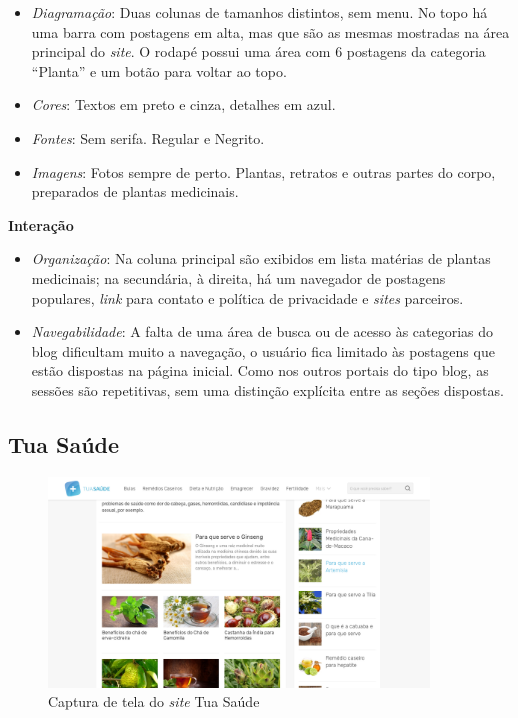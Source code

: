 \begin{itemize}
\item
  \emph{Diagramação}: Duas colunas de tamanhos distintos, sem menu. No topo há uma barra com postagens em alta, mas que são as mesmas mostradas na área principal do \emph{site}. O rodapé possui uma área com 6 postagens da categoria ``Planta'' e um botão para voltar ao topo.
\item
  \emph{Cores}: Textos em preto e cinza, detalhes em azul.
\item
  \emph{Fontes}: Sem serifa. Regular e Negrito.
\item
  \emph{Imagens}: Fotos sempre de perto. Plantas, retratos e outras partes do corpo, preparados de plantas medicinais.
\end{itemize}

\textbf{Interação}

\begin{itemize}
\item
  \emph{Organização}: Na coluna principal são exibidos em lista matérias de plantas medicinais; na secundária, à direita, há um navegador de postagens populares, \emph{link} para contato e política de privacidade e \emph{sites} parceiros.
\item
  \emph{Navegabilidade}: A falta de uma área de busca ou de acesso às categorias do blog dificultam muito a navegação, o usuário fica limitado às postagens que estão dispostas na página inicial. Como nos outros portais do tipo blog, as sessões são repetitivas, sem uma distinção explícita entre as seções dispostas.
\end{itemize}

\subsection{Tua Saúde}\label{tua-saude}

\begin{figure}
\centering
\caption{\label{fig-tuasaude}Captura de tela do \emph{site} Tua Saúde}
\includegraphics[width=0.9\textwidth]{images/similares/tuasaude.png}
\end{figure}

